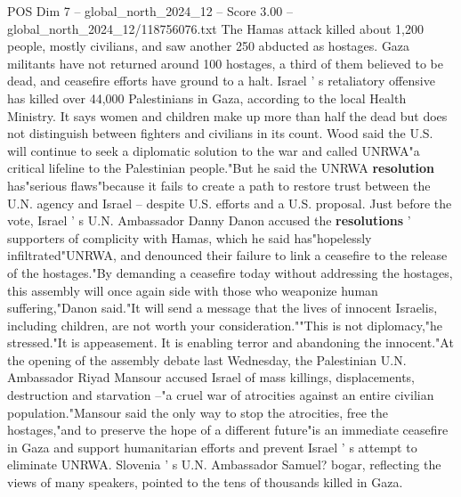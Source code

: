 \begin{textsample}{POS Dim 7 – global\_north\_2024\_12 – Score 3.00 – global\_north\_2024\_12/118756076.txt}
The Hamas attack killed about 1,200 people, mostly civilians, and saw another 250 abducted as hostages.
Gaza militants have not returned around 100 hostages, a third of them believed to be dead, and ceasefire efforts have ground to a halt.
Israel ' s retaliatory offensive has killed over 44,000 Palestinians in Gaza, according to the local Health Ministry.
It says women and children make up more than half the dead but does not distinguish between fighters and civilians in its count.
Wood said the U.S. will continue to seek a diplomatic solution to the war and called UNRWA"a critical lifeline to the Palestinian people."But he said the UNRWA \textbf{resolution} has"serious flaws"because it fails to create a path to restore trust between the U.N. agency and Israel -- despite U.S. efforts and a U.S. proposal.
Just before the vote, Israel ' s U.N.
Ambassador Danny Danon accused the \textbf{resolutions} ' supporters of complicity with Hamas, which he said has"hopelessly infiltrated"UNRWA, and denounced their failure to link a ceasefire to the release of the hostages."By demanding a ceasefire today without addressing the hostages, this assembly will once again side with those who weaponize human suffering,"Danon said."It will send a message that the lives of innocent Israelis, including children, are not worth your consideration.""This is not diplomacy,"he stressed."It is appeasement.
It is enabling terror and abandoning the innocent."At the opening of the assembly debate last Wednesday, the Palestinian U.N.
Ambassador Riyad Mansour accused Israel of mass killings, displacements, destruction and starvation --"a cruel war of atrocities against an entire civilian population."Mansour said the only way to stop the atrocities, free the hostages,"and to preserve the hope of a different future"is an immediate ceasefire in Gaza and support humanitarian efforts and prevent Israel ' s attempt to eliminate UNRWA.
Slovenia ' s U.N.
Ambassador Samuel? bogar, reflecting the views of many speakers, pointed to the tens of thousands killed in Gaza.

\end{textsample}
